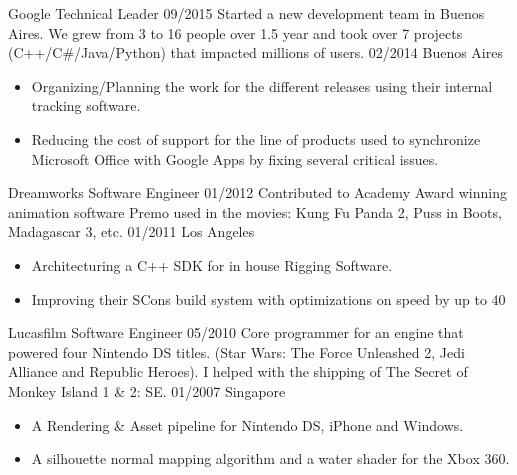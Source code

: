 \begin{experiences}
   \experience
    {Google} 				{Technical Leader}
	{09/2015} 			{Started a new development team in Buenos Aires. We grew from 3 to 16 people over 1.5 year and took over 7 projects (C++/C\#/Java/Python) that impacted millions of users.}
	{02/2014}	 	
	{Buenos Aires}			{
						  \begin{itemize}
							\item Organizing/Planning the work for the different releases using their internal tracking software.
							\item Reducing the cost of support for the line of products used to synchronize Microsoft Office with Google Apps by fixing several critical issues.
						  \end{itemize}
						 }
   \emptySeparator
   
   \experience
    {Dreamworks} 			{Software Engineer}
    {01/2012} 				{Contributed to Academy Award winning animation software Premo used in the movies: Kung Fu Panda 2, Puss in Boots, Madagascar 3, etc.}
	{01/2011}	 	
	{Los Angeles}			{
						  \begin{itemize}
							\item Architecturing a C++ SDK for in house Rigging Software.
							\item Improving their SCons build system with optimizations on speed by up to 40%
						  \end{itemize}
						 }
   \emptySeparator
   
   \experience
    {Lucasfilm} 			{Software Engineer}
    {05/2010} 				{Core programmer for an engine that powered four Nintendo DS titles. (Star Wars: The Force Unleashed 2, Jedi Alliance and Republic Heroes). I helped with the shipping of The Secret of Monkey Island 1 \& 2: SE.}
	{01/2007}	 	
	{Singapore}			{
						  \begin{itemize}
							\item A Rendering \& Asset pipeline for Nintendo DS, iPhone and Windows.
							\item A silhouette normal mapping algorithm and a water shader for the Xbox 360.
						  \end{itemize}
						 }
  
\end{experiences}
